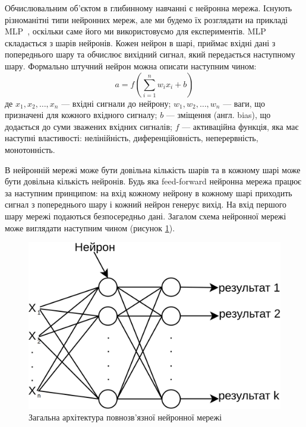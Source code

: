 Обчислювальним об'єктом в глибинному навчанні є нейронна мережа. Існують різноманітні типи нейронних мереж, але ми будемо їх розглядати на прикладі MLP~\cite{ct26}, оскільки саме його ми використовуємо для експериментів. MLP складається з шарів нейронів. Кожен нейрон в шарі, приймає вхідні дані з попереднього шару та обчислює вихідний сигнал, який передається наступному шару. Формально штучний нейрон можна описати наступним чином:
\begin{equation}
\label{eq:neuron}
	a = f\left(\sum_{i=1}^n w_i x_i + b \right)
\end{equation}
де \(x_1, x_2, \ldots, x_n\) — вхідні сигнали до нейрону; \(w_1, w_2, \ldots, w_n\) — ваги, що призначені для кожного вхідного сигналу; \(b\) — зміщення (англ. bias), що додається до суми зважених вхідних сигналів; \(f\) — активаційна функція, яка має наступні властивості: нелінійність, диференційовність, неперервність, монотонність. 

В нейронній мережі може бути довільна кількість шарів та в кожному шарі може бути довільна кількість нейронів. Будь яка feed-forward нейронна мережа працює за наступним принципом: на вхід кожному нейрону в кожному шарі приходить сигнал з попереднього шару і кожний нейрон генерує вихід. На вхід першого шару мережі подаються безпосередньо дані. Загалом схема нейронної мережі може виглядати наступним чином (рисунок \ref{fig_nn_arch}).

\begin{figure}[ht]
	\centering
	\includegraphics[scale=0.3]{Images/neural_network_architecture.png}
	\caption{Загальна архітектура повнозв'язної нейронної мережі}
	\label{fig_nn_arch}
\end{figure}

